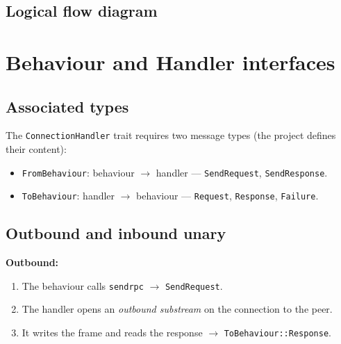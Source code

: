 \documentclass[11pt,a4paper]{article}
\newcommand{\code}[1]{{\def\_{\textunderscore\allowbreak}\texttt{#1}}}
\begin{document}
\subsection{Logical flow diagram}

\noindent{}

\section{Behaviour and Handler interfaces}

\subsection{Associated types}

The \code{ConnectionHandler} trait requires two message types (the project defines their content):

\begin{itemize}[nosep]
  \item \code{FromBehaviour}: behaviour $\rightarrow$ handler --- \code{SendRequest},
        \code{SendResponse}.
  \item \code{ToBehaviour}: handler $\rightarrow$ behaviour --- \code{Request},
        \code{Response}, \code{Failure}.
\end{itemize}

\subsection{Outbound and inbound unary}

\textbf{Outbound:}
\begin{enumerate}[label=\arabic*., nosep]
  \item The behaviour calls \code{send\_rpc} $\rightarrow$ \code{SendRequest}.
  \item The handler opens an \emph{outbound substream} on the connection to the peer.
  \item It writes the frame and reads the response $\rightarrow$ \code{ToBehaviour::Response}.
\end{enumerate}
\end{document}
